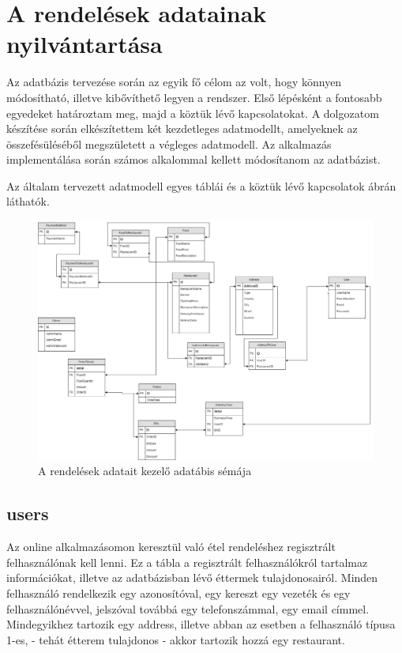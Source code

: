 \chapter{A rendelések adatainak nyilvántartása}


Az adatbázis tervezése során az egyik fő célom az volt, hogy könnyen módosítható, illetve kibővíthető legyen a rendszer. Első lépésként a fontosabb egyedeket határoztam meg, majd a köztük lévő kapcsolatokat. A dolgozatom készítése során elkészítettem két kezdetleges adatmodellt, amelyeknek az összefésüléséből megszületett a végleges adatmodell. Az alkalmazás implementálása során számos alkalommal kellett módosítanom az adatbázist.

Az általam tervezett adatmodell egyes táblái és a köztük lévő kapcsolatok  ábrán láthatók.

\begin{figure}
\includegraphics[scale=0.3]{kepek/rendeles_sema.jpg}
\caption{A rendelések adatait kezelő adatábis sémája}
\label{fig:rendeles_sema}
\end{figure}

\section{users}

Az online alkalmazásomon keresztül való étel rendeléshez regisztrált felhasználónak kell lenni. Ez a tábla a regisztrált felhasználókról tartalmaz információkat, illetve az adatbázisban lévő éttermek tulajdonosairól. Minden felhasználó rendelkezik egy azonosítóval, egy kereszt egy vezeték és egy felhasználónévvel, jelszóval továbbá egy telefonszámmal, egy email címmel. Mindegyikhez tartozik egy address, illetve abban az esetben a felhasználó típusa 1-es, - tehát étterem tulajdonos - akkor tartozik hozzá egy restaurant.

